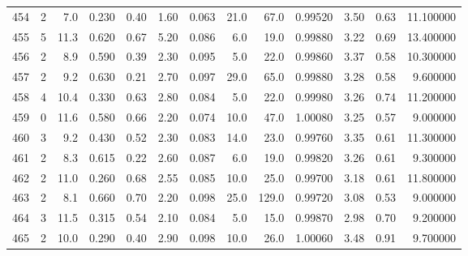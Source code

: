 \begin{tabular}{lrrrrrrrrrrrr}
454  &        2 &            7.0 &             0.230 &         0.40 &            1.60 &      0.063 &                 21.0 &                  67.0 &  0.99520 &  3.50 &       0.63 &  11.100000 \\
455  &        5 &           11.3 &             0.620 &         0.67 &            5.20 &      0.086 &                  6.0 &                  19.0 &  0.99880 &  3.22 &       0.69 &  13.400000 \\
456  &        2 &            8.9 &             0.590 &         0.39 &            2.30 &      0.095 &                  5.0 &                  22.0 &  0.99860 &  3.37 &       0.58 &  10.300000 \\
457  &        2 &            9.2 &             0.630 &         0.21 &            2.70 &      0.097 &                 29.0 &                  65.0 &  0.99880 &  3.28 &       0.58 &   9.600000 \\
458  &        4 &           10.4 &             0.330 &         0.63 &            2.80 &      0.084 &                  5.0 &                  22.0 &  0.99980 &  3.26 &       0.74 &  11.200000 \\
459  &        0 &           11.6 &             0.580 &         0.66 &            2.20 &      0.074 &                 10.0 &                  47.0 &  1.00080 &  3.25 &       0.57 &   9.000000 \\
460  &        3 &            9.2 &             0.430 &         0.52 &            2.30 &      0.083 &                 14.0 &                  23.0 &  0.99760 &  3.35 &       0.61 &  11.300000 \\
461  &        2 &            8.3 &             0.615 &         0.22 &            2.60 &      0.087 &                  6.0 &                  19.0 &  0.99820 &  3.26 &       0.61 &   9.300000 \\
462  &        2 &           11.0 &             0.260 &         0.68 &            2.55 &      0.085 &                 10.0 &                  25.0 &  0.99700 &  3.18 &       0.61 &  11.800000 \\
463  &        2 &            8.1 &             0.660 &         0.70 &            2.20 &      0.098 &                 25.0 &                 129.0 &  0.99720 &  3.08 &       0.53 &   9.000000 \\
464  &        3 &           11.5 &             0.315 &         0.54 &            2.10 &      0.084 &                  5.0 &                  15.0 &  0.99870 &  2.98 &       0.70 &   9.200000 \\
465  &        2 &           10.0 &             0.290 &         0.40 &            2.90 &      0.098 &                 10.0 &                  26.0 &  1.00060 &  3.48 &       0.91 &   9.700000 \\

\end{tabular}
